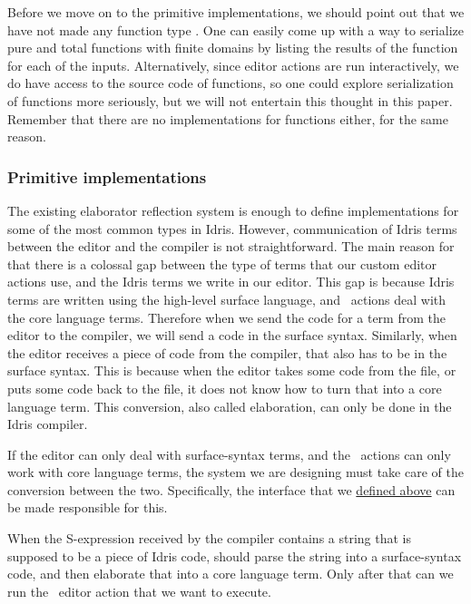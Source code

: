 Before we move on to the primitive  implementations,
we should point out that we have not made any function type .
One can easily come up with a way to serialize pure and total functions with
finite domains by listing the results of the function for each of the inputs.
Alternatively, since editor actions are run interactively, we do have access to
the source code of functions, so one could explore serialization of functions
more seriously, but we will not entertain this thought in this paper.
Remember that there are no  implementations for functions either, for
the same reason.

\subsubsection{Primitive  implementations}\label{ssec:primitiveEditorableDesign}

The existing elaborator reflection system is enough to define 
implementations for some of the most common types in Idris.
However, communication of Idris terms between the editor and the compiler is
not straightforward. The main reason for that there is a colossal gap between
the type of terms that our custom editor actions use, and the Idris terms we
write in our editor.
This gap is because Idris terms are written using the high-level surface
language, and \Elab\ actions deal with the core language terms. Therefore when
we send the code for a term from the editor to the compiler, we will send a
code in the surface syntax. Similarly, when the editor receives a piece of code
from the compiler, that also has to be in the surface syntax. This is because
when the editor takes some code from the file, or puts some code back to the
file, it does not know how to turn that into a core language term.
This conversion, also called elaboration, can only be done in the Idris compiler.

If the editor can only deal with surface-syntax terms, and the \Elab\ actions
can only work with core language terms, the system we are designing must take
care of the conversion between the two.
Specifically, the  interface that we
\hyperref[code:editorable]{defined above} can be made responsible for this.

When the S-expression received by the compiler contains a string that is
supposed to be a piece of Idris code,  should parse the string
into a surface-syntax code, and then elaborate that into a core language term.
Only after that can we run the \Elab\ editor action that we want to execute.

